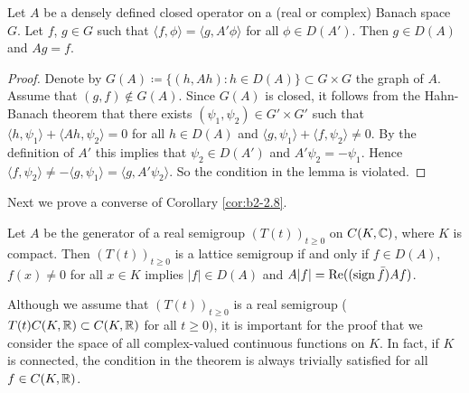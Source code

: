\begin{lemma}\label{lem:b2-2.9}
Let $A$ be a densely defined closed operator on a (real or complex) Banach space $G$.
Let $f$, $g \in G$ such that $\langle f,\phi \rangle = \langle g,A'\phi \rangle$ for all $\phi \in D(A')$.
Then $g \in D(A)$ and $Ag = f$.
\end{lemma}
\begin{proof}
Denote by $G(A) \coloneqq \{(h,Ah) \colon h \in D(A)\} \subset G \times G$ the graph of $A$.
Assume that $(g,f) \notin G(A)$.
Since $G(A)$ is closed, it follows from the Hahn-Banach theorem that there exists $(\psi_{1},\psi_{2}) \in G' \times G'$ such that $\langle h,\psi_{1} \rangle + \langle Ah,\psi_{2} \rangle = 0$ for all $h \in D(A)$ and $\langle g,\psi_{1} \rangle + \langle f,\psi_{2} \rangle \neq 0$.
By the definition of $A'$ this implies that $\psi_{2} \in D(A')$ and $A'\psi_{2} = -\psi_{1}$.
Hence $\langle f,\psi_{2} \rangle \neq -\langle g,\psi_{1} \rangle = \langle g,A'\psi_{2} \rangle$.
So the condition in the lemma is violated.
\end{proof}
Next we prove a converse of Corollary \ref{cor:b2-2.8}.
\begin{theorem}\label{thm:b2-2.10}
Let $A$ be the generator of a real semigroup $(T(t))_{t \geq 0}$ on $C(K,\mathbb{C})$, where $K$ is compact.
Then $(T(t))_{t \geq 0}$ is a lattice semigroup if and only if $f \in D(A)$, $f(x) \neq 0$ for all $x \in K$ implies $|f| \in D(A)$ and $A|f| = \mathop{}\!\mathrm{Re}((\operatorname{sign} \bar{f})Af)$.
\end{theorem}
\begin{remark*}\label{rem:b2-2.10-KGK}
Although we assume that $(T(t))_{t \geq 0}$ is a real semigroup (\ie \\ $T(t)C(K,\mathbb{R}) \subset C(K,\mathbb{R})$ for all $t \geq 0)$, it is important for the proof that we consider the space of all complex-valued continuous functions on $K$.
In fact, if $K$ is connected, the condition in the theorem is always trivially satisfied for all $f \in C(K,\mathbb{R})$.
\end{remark*}

